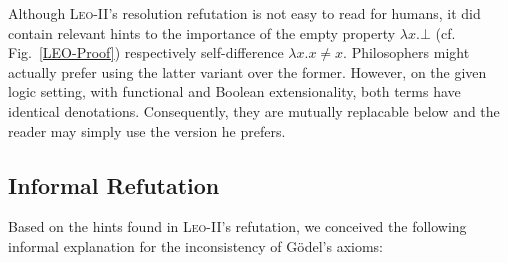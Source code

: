 \documentclass{article}
\begin{document}
Although \textsc{Leo-II}'s resolution refutation is not easy to read
for humans, it did contain relevant hints to the importance of the
empty property $\lambda x. \bot$ (cf. Fig.~\ref{LEO-Proof})
respectively self-difference $\lambda x.  x\not=x$. Philosophers
might actually prefer using the latter variant over the
former. However, on the given logic setting, with functional and
Boolean extensionality, both terms have identical
denotations. Consequently, they are mutually replacable below and the
reader may simply use the version he prefers.

\subsection{Informal Refutation}

Based on the hints found in \textsc{Leo-II}'s refutation, we conceived the following informal explanation for the inconsistency of G\"odel's axioms:
\end{document}
